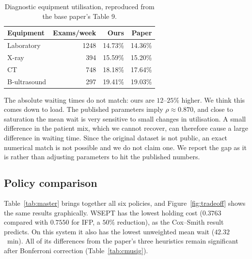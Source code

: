 \documentclass[sigconf,nonacm]{acmart}
\begin{document}
\begin{table}[t]
\caption{Diagnostic equipment utilisation, reproduced from the base paper's
         Table 9.}
\label{tab:equip}
\small
\begin{tabular}{@{}lrrr@{}}
\toprule
\textbf{Equipment} & \textbf{Exams/week} & \textbf{Ours} & \textbf{Paper} \\
\midrule
Laboratory   & 1248 & 14.73\% & 14.36\% \\
X-ray        &  394 & 15.59\% & 15.20\% \\
CT           &  748 & 18.18\% & 17.64\% \\
B-ultrasound &  297 & 19.41\% & 19.03\% \\
\bottomrule
\end{tabular}
\end{table}

The absolute waiting times do not match: ours are $12$--$25\%$ higher. We
think this comes down to load. The published parameters imply
$\rho\approx0.870$, and close to saturation the mean wait is very sensitive to
small changes in utilisation. A small difference in the patient mix, which we
cannot recover, can therefore cause a large difference in waiting time. Since
the original dataset is not public, an exact numerical match is not possible
and we do not claim one. We report the gap as it is rather than adjusting
parameters to hit the published numbers.

\subsection{Policy comparison}
Table~\ref{tab:master} brings together all six policies, and
Figure~\ref{fig:tradeoff} shows the same results graphically. WSEPT has the
lowest holding cost ($0.3763$ compared with $0.7550$ for IFP, a $50\%$
reduction), as the Cox--Smith result predicts. On this system it also has the
lowest unweighted mean wait ($42.32$~min). All of its differences from the
paper's three heuristics remain significant after Bonferroni correction
(Table~\ref{tab:cmusig}).
\end{document}
